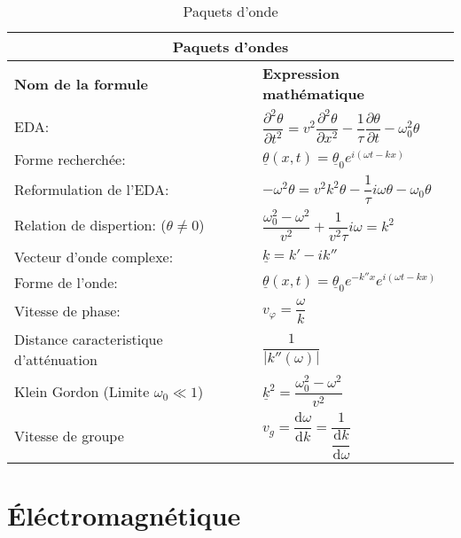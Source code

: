 \documentclass[10pt,a4paper,titlepage,portrait]{article}
\renewcommand{\d}
{
    \mathrm{d}
}
\newcommand*{\dv}[2]
{
    \dfrac{\d#1}{\d#2}
}
\newcommand*{\dpv}[2]
{
    \dfrac{\partial#1}{\partial#2}
}
\newcommand*{\ddpv}[2]
{
    \dfrac{\partial^2#1}{\partial{#2}^2}
}
\renewcommand{\arraystretch}{2}
\begin{document}
\begin{center}
\begin{table}[H]
    \centering
    \renewcommand{\arraystretch}{1.5} %
    \setlength{\tabcolsep}{8pt} %
    \begin{tabular}{@{}p{9cm}p{10cm}@{}}
        \toprule
        \multicolumn{2}{c}{\textbf{Paquets d'ondes}} \\
        \midrule
        \textbf{Nom de la formule} & \textbf{Expression mathématique} \\
        \midrule
        EDA: & $\ddpv{\theta}{t}=v^2\ddpv{\theta}{x}-\dfrac{1}{\tau}\dpv{\theta}{t}-\omega_0^2\theta$ \\
        Forme recherchée: & $\underline{\theta}(x,t)=\underline{\theta}_0e^{i(\omega t-kx)}$\\
        Reformulation de l'EDA: & $-\omega^2\theta=v^2k^2\theta-\dfrac{1}{\tau}i\omega\theta-\omega_0\theta$\\
        Relation de dispertion: ($\theta\neq0$) & $\dfrac{\omega_0^2-\omega^2}{v^2}+\dfrac{1}{v^2\tau}i\omega=k^2$\\
        Vecteur d'onde complexe: & $\underline{k}=k'-ik ''$\\
        Forme de l'onde: & $\underline{\theta}(x,t)=\underline{\theta}_0e^{-k''x}e^{i(\omega t-kx)}$\\
        Vitesse de phase: & $v_{\varphi}=\dfrac{\omega}{k}$ \\
        Distance caracteristique d'atténuation & $\dfrac{1}{|k''(\omega)|}$ \\
        Klein Gordon (Limite $\omega_0 \ll 1$) & $\underline{k}^2=\dfrac{\omega_0^2-\omega^2}{v^2}$ \\
        Vitesse de groupe & $v_g=\dv{\omega}{k}=\dfrac{1}{\dv{k}{\omega}}$ \\
    \bottomrule
\end{tabular}
\caption{Paquets d'onde}
\label{tab:packonde}
\end{table}

\section{Éléctromagnétique}


\end{center}
\end{document}
